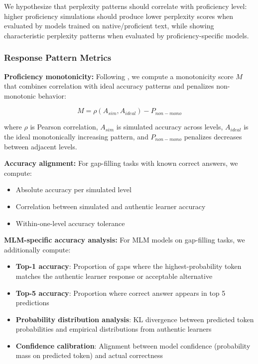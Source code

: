 We hypothesize that perplexity patterns should correlate with proficiency level: higher proficiency simulations should produce lower perplexity scores when evaluated by models trained on native/proficient text, while showing characteristic perplexity patterns when evaluated by proficiency-specific models.

\subsubsection{Response Pattern Metrics}

\textbf{Proficiency monotonicity:} Following \citet{benedetto2024using}, we compute a monotonicity score $M$ that combines correlation with ideal accuracy patterns and penalizes non-monotonic behavior:

\[M = \rho(A_{sim}, A_{ideal}) - P_{non-mono}\]

where $\rho$ is Pearson correlation, $A_{sim}$ is simulated accuracy across levels, $A_{ideal}$ is the ideal monotonically increasing pattern, and $P_{non-mono}$ penalizes decreases between adjacent levels.

\textbf{Accuracy alignment:} For gap-filling tasks with known correct answers, we compute:
\begin{itemize}
    \item Absolute accuracy per simulated level
    \item Correlation between simulated and authentic learner accuracy
    \item Within-one-level accuracy tolerance
\end{itemize}

\textbf{MLM-specific accuracy analysis:} For MLM models on gap-filling tasks, we additionally compute:
\begin{itemize}
    \item \textbf{Top-1 accuracy}: Proportion of gaps where the highest-probability token matches the authentic learner response or acceptable alternative
    \item \textbf{Top-5 accuracy}: Proportion where correct answer appears in top 5 predictions
    \item \textbf{Probability distribution analysis}: KL divergence between predicted token probabilities and empirical distributions from authentic learners
    \item \textbf{Confidence calibration}: Alignment between model confidence (probability mass on predicted token) and actual correctness
\end{itemize}

